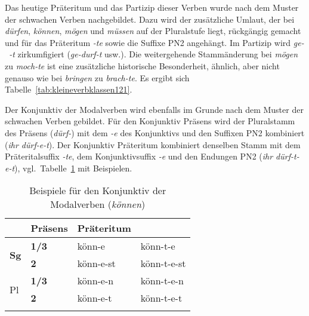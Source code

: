 Das heutige Präteritum und das Partizip dieser Verben wurde nach dem Muster der schwachen Verben nachgebildet.
Dazu wird der zusätzliche Umlaut, der bei \textit{dürfen}, \textit{können}, \textit{mögen} und \textit{müssen} auf der Pluralstufe liegt, rückgängig gemacht und für das Präteritum \textit{-te} sowie die Suffixe PN2 angehängt.
Im Partizip wird \mbox{\textit{ge-~-t}} zirkumfigiert (\textit{ge-durf-t} usw.).
Die weitergehende Stammänderung bei \textit{mögen} zu \textit{moch-te} ist eine zusätzliche historische Besonderheit, ähnlich, aber nicht genauso wie bei \textit{bringen} zu \textit{brach-te}.
Es ergibt sich Tabelle~\ref{tab:kleineverbklassen121}.

\begin{table}[!htbp]
  \caption{Präteritum der Modalverben}
  \label{tab:kleineverbklassen121}
\end{table}

Der Konjunktiv der Modalverben wird ebenfalls im Grunde nach dem Muster der schwachen Verben gebildet.
Für den Konjunktiv Präsens wird der Pluralstamm des Präsens (\textit{dürf-}) mit dem \textit{-e} des Konjunktivs und den Suffixen PN2 kombiniert (\textit{ihr dürf-e-t}).
Der Konjunktiv Präteritum kombiniert denselben Stamm mit dem Präteritalsuffix \textit{-te}, dem Konjunktivsuffix \textit{-e} und den Endungen PN2 (\textit{ihr dürf-t-e-t}), vgl.\ Tabelle~\ref{tab:kleineverbklassen122} mit Beispielen.

\begin{table}[!htbp]
  \centering
  \begin{tabular}{llll}
    \lsptoprule
    \multicolumn{2}{c}{} & \textbf{Präsens} & \textbf{Präteritum} \\
    \midrule
    \multirow{2}{*}{\textbf{Sg}} & \textbf{1/3} & könn-e & könn-t-e \\
    & \textbf{2} & könn-e-st & könn-t-e-st \\
    \midrule
    \multirow{2}{*}{Pl} & \textbf{1/3} & könn-e-n & könn-t-e-n \\
    & \textbf{2} & könn-e-t & könn-t-e-t \\
    \lspbottomrule
  \end{tabular}
  \caption{Beispiele für den Konjunktiv der Modalverben (\textit{können})}
  \label{tab:kleineverbklassen122}
\end{table}

